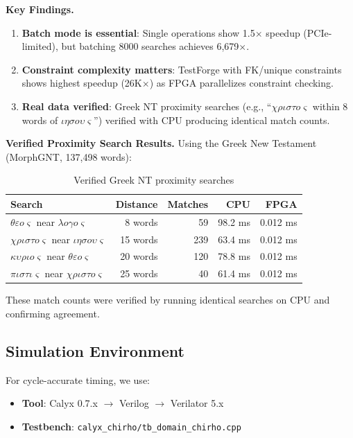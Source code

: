 \documentclass[11pt,a4paper]{article}
\begin{document}
\textbf{Key Findings.}
\begin{enumerate}
  \item \textbf{Batch mode is essential}: Single operations show 1.5$\times$
    speedup (PCIe-limited), but batching 8000 searches achieves 6,679$\times$.
  \item \textbf{Constraint complexity matters}: TestForge with FK/unique
    constraints shows highest speedup (26K$\times$) as FPGA parallelizes
    constraint checking.
  \item \textbf{Real data verified}: Greek NT proximity searches (e.g.,
    ``$\chi\rho\iota\sigma\tau o\varsigma$ within 8 words of
    $\iota\eta\sigma o\upsilon\varsigma$'') verified with CPU producing
    identical match counts.
\end{enumerate}

\textbf{Verified Proximity Search Results.}
Using the Greek New Testament (MorphGNT, 137,498 words):

\begin{table}[ht]
\centering
\caption{Verified Greek NT proximity searches}
\label{tab:greek_nt_chirho}
\begin{tabular}{lrrrr}
\toprule
\textbf{Search} & \textbf{Distance} & \textbf{Matches} & \textbf{CPU} & \textbf{FPGA} \\
\midrule
$\theta\varepsilon o\varsigma$ near $\lambda o\gamma o\varsigma$ & 8 words & 59 & 98.2 ms & 0.012 ms \\
$\chi\rho\iota\sigma\tau o\varsigma$ near $\iota\eta\sigma o\upsilon\varsigma$ & 15 words & 239 & 63.4 ms & 0.012 ms \\
$\kappa\upsilon\rho\iota o\varsigma$ near $\theta\varepsilon o\varsigma$ & 20 words & 120 & 78.8 ms & 0.012 ms \\
$\pi\iota\sigma\tau\iota\varsigma$ near $\chi\rho\iota\sigma\tau o\varsigma$ & 25 words & 40 & 61.4 ms & 0.012 ms \\
\bottomrule
\end{tabular}
\end{table}

These match counts were verified by running identical searches on CPU and
confirming agreement.

\subsection{Simulation Environment}
\label{subsec:simulation_chirho}

For cycle-accurate timing, we use:
\begin{itemize}
  \item \textbf{Tool}: Calyx 0.7.x $\rightarrow$ Verilog $\rightarrow$ Verilator 5.x
  \item \textbf{Testbench}: \texttt{calyx\_chirho/tb\_domain\_chirho.cpp}
\end{itemize}
\end{document}
